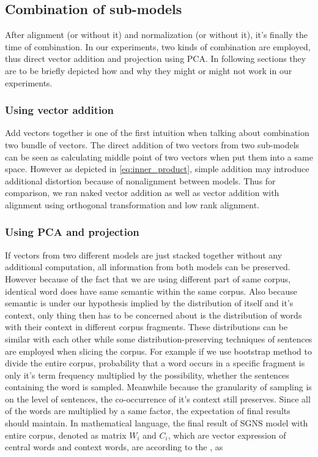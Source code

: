   \subsection{Combination of sub-models}
  After alignment (or without it) and normalization (or without it), it's finally the time of combination. In our experiments, two kinds of combination are employed, thus direct vector addition and projection using PCA. In following sections they are to be briefly depicted how and why they might or might not work in our experiments.

  \subsubsection{Using vector addition}
  Add vectors together is one of the first intuition when talking about combination two bundle of vectors. The direct addition of two vectors from two sub-models can be seen as calculating middle point of two vectors when put them into a same space. However as depicted in \eqref{eq:inner_product}, simple addition may introduce additional distortion because of nonalignment between models. Thus for comparison, we ran naked vector addition as well as vector addition with alignment using orthogonal transformation and low rank alignment.

  \subsubsection{Using PCA and projection}
  If vectors from two different models are just stacked together without any additional computation, all information from both models can be preserved. However because of the fact that we are using different part of same corpus, identical word does have same semantic within the same corpus. Also because semantic is under our hypothesis implied by the distribution of itself and it's context, only thing then has to be concerned about is the distribution of words with their context in different corpus fragments. These distributions can be similar with each other while some distribution-preserving techniques of sentences are employed when slicing the corpus. For example if we use bootstrap method to divide the entire corpus, probability that a word occurs in a specific fragment is only it's term frequency multiplied by the possibility, whether the sentences containing the word is sampled. Meanwhile because the granularity of sampling is on the level of sentences, the co-occurrence of it's context still preserves. Since all of the words are multiplied by a same factor, the expectation of final results should maintain. In mathematical language, the final result of SGNS model with entire corpus, denoted as matrix $W_i$ and $C_i$, which are vector expression of central words and context words, are according to the \cite{levy2014neural}, as
  
